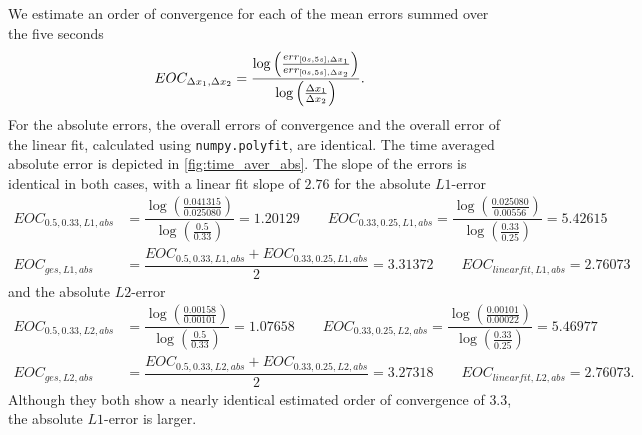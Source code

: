 We estimate an order of convergence for each of the mean errors summed over the five seconds
\begin{equation*}
    EOC_{\Delta x_1,\Delta x_2} = \dfrac{\log \left( \frac{err_{[0s,5s], \Delta x_1}}{err_{[0s,5s],\Delta x_2}} \right)}{\log \left( \frac{\Delta x_1}{\Delta x_2} \right)}.
\end{equation*}
For the absolute errors, the overall errors of convergence and the overall error of the linear fit, calculated using \lstinline|numpy.polyfit|, are identical.
The time averaged absolute error is depicted in \ref{fig:time_aver_abs}. The slope of the errors is identical in both cases, with a linear fit slope of $2.76$ for the absolute $L1$-error
\begin{align*}
    EOC_{0.5,0.33,L1,abs} &= \dfrac{\log \left( \frac{0.041315}{0.025080} \right)}{\log \left( \frac{0.5}{0.33} \right)} = 1.20129
    \qquad EOC_{0.33,0.25,L1,abs} = \dfrac{\log \left( \frac{0.025080}{0.00556} \right)}{\log \left( \frac{0.33}{0.25} \right)} =5.42615 \\
    EOC_{ges,L1,abs} &= \dfrac{EOC_{0.5,0.33,L1,abs} + EOC_{0.33,0.25,L1,abs}}{2} = 3.31372 \qquad EOC_{linearfit,L1,abs} = 2.76073
\end{align*}
and the absolute $L2$-error
\begin{align*}
    EOC_{0.5,0.33,L2,abs} &= \dfrac{\log \left( \frac{0.00158}{0.00101} \right)}{\log \left( \frac{0.5}{0.33} \right)} = 1.07658
    \qquad EOC_{0.33,0.25,L2,abs} = \dfrac{\log \left( \frac{0.00101}{0.00022} \right)}{\log \left( \frac{0.33}{0.25} \right)} =5.46977 \\
    EOC_{ges,L2,abs} &= \dfrac{EOC_{0.5,0.33,L2,abs} + EOC_{0.33,0.25,L2,abs}}{2} = 3.27318
    \qquad EOC_{linearfit,L2,abs} = 2.76073.
\end{align*}
Although they both show a nearly identical estimated order of convergence of $3.3$, the absolute $L1$-error is larger.

